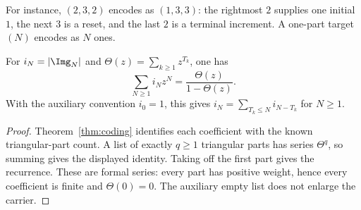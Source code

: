For instance, $(2,3,2)$ encodes as $(1,3,3)$: the rightmost $2$ supplies
one initial $1$, the next $3$ is a reset, and the last $2$ is a terminal
increment. A one-part target $(N)$ encodes as $N$ ones.

\begin{corollary}\label{cor:series}
For $i_N=\lvert\Img_N\rvert$ and
$\Theta(z)=\sum_{k\ge1}z^{T_k}$, one has
\[
 \sum_{N\ge1}i_Nz^N=\frac{\Theta(z)}{1-\Theta(z)}.
\]
With the auxiliary convention $i_0=1$, this gives
$i_N=\sum_{T_k\le N}i_{N-T_k}$ for $N\ge1$.
\end{corollary}
\begin{proof}
Theorem~\ref{thm:coding} identifies each coefficient with the known
triangular-part count. A list of exactly $q\ge1$ triangular parts has
series $\Theta^q$, so summing gives the displayed identity. Taking off
the first part gives the recurrence. These are formal series: every
part has positive weight, hence every coefficient is finite and
$\Theta(0)=0$. The auxiliary empty list does not enlarge the carrier.
\end{proof}
